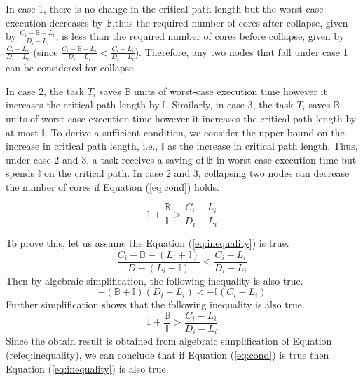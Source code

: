 


In case 1, there is no change in the critical path length but the worst case execution decreases by $\mathbb{B}$,thus the required number of cores after collapse, given by $\frac{C_i - \mathbb{B} - L_i}{D_i - L_i}$, is less than the required number of cores before collapse, given by $\frac{C_i - L_i}{D_i - L_i}$  (since $\frac{C_i - \mathbb{B} - L_i}{D_i - L_i} < \frac{C_i - L_i}{D_i - L_i}$). Therefore, any two nodes that fall under case 1 can be considered for collapse. 

In case 2, the task $T_i$ saves $\mathbb{B}$ units of worst-case execution time however it increases the critical path length by $\mathbb{I}$. Similarly, in case 3, the task $T_i$ saves $\mathbb{B}$ units of worst-case execution time however it increases the critical path length by at most $\mathbb{I}$. To derive a sufficient condition, we consider the upper bound on the increase in critical path length, i.e., $\mathbb{I}$ as the increase in critical path length. Thus, under case 2 and 3, a task receives a saving of $\mathbb{B}$ in worst-case execution time but spends $\mathbb{I}$ on the critical path. In case 2 and 3, collapsing two nodes can decrease the number of cores if Equation (\ref{eq:cond}) holds.

\begin{equation} \label{eq:cond} 1 + \frac{\mathbb{B}}{\mathbb{I}} > \frac{C_i  - L_i }{D_i - L_i} \end{equation}

To prove this, let us assume the Equation (\ref{eq:inequality}) is true.
\begin{equation} \label{eq:inequality} \frac{C_i - \mathbb{B} - (L_i + \mathbb{I})}{D - (L_i + \mathbb{I})}  < \frac{C_i  - L_i }{D_i - L_i} \end{equation}
Then by algebraic simplification, the following inequality is also true.
$$ - ( \mathbb{B} + \mathbb{I}) (D_i - L_i)  < -\mathbb{I}(C_i  - L_i )$$
Further simplification shows that the following inequality is also true.
$$ 1 + \frac{\mathbb{B}}{\mathbb{I}} > \frac{C_i  - L_i }{D_i - L_i}$$
Since the obtain result is obtained from algebraic simplification of Equation (ref{eq:inequality}), we can conclude that if Equation (\ref{eq:cond}) is true then Equation (\ref{eq:inequality}) is also true.
